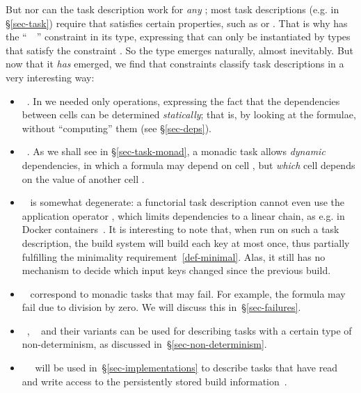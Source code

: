 But nor can the task description work for \emph{any} ; most task
descriptions (e.g.  in \S\ref{sec-task}) require that 
satisfies certain properties, such as  or . That is
why  has the ``~~\hs{=>}'' constraint in its type,
expressing that  can only be instantiated by types that satisfy the
constraint . So the type  emerges naturally, almost inevitably.
But now that it \emph{has} emerged, we find that constraints  classify
task descriptions in a very interesting way:
\begin{itemize}
\item {}~. In  we needed only 
  operations, expressing the fact that the dependencies between cells can be
  determined \emph{statically}; that is, by looking at the formulae, without
  ``computing'' them (see \S\ref{sec-deps}).
\item {}~. As we shall see in \S\ref{sec-task-monad}, a monadic
  task allows \emph{dynamic} dependencies, in which a formula may depend on cell
  , but \emph{which} cell  depends on the value of another cell
  .
\item {}~ is somewhat degenerate: a functorial task
  description cannot even use the application operator \hs{<*>}, which limits
  dependencies to a linear chain, as e.g. in Docker containers~\cite{docker}. It
  is interesting to note that, when run on such a task description, the
   build system will build each key at most once, thus partially
  fulfilling the minimality requirement~\ref{def-minimal}. Alas, it still has no
  mechanism to decide which input keys changed since the previous build.
\item {}~ correspond to monadic tasks that may fail. For
  example, the formula  may fail due to division by zero. We will
  discuss this in~\S\ref{sec-failures}.
\item {}~, ~ and their
  variants can be used for describing tasks with a certain type of
  non-determinism, as discussed in~\S\ref{sec-non-determinism}.
\item {}~~ will be used
  in~\S\ref{sec-implementations} to describe tasks that have read and write
  access to the persistently stored build information~.
\end{itemize}

